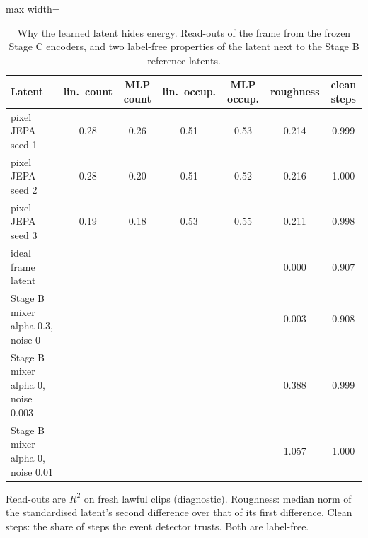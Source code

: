 \begin{table}[t]\centering\small
\caption{Why the learned latent hides energy. Read-outs of the frame from the frozen Stage C encoders, and two label-free properties of the latent next to the Stage B reference latents.}\label{tab:diag}
\begin{adjustbox}{max width=\linewidth}\begin{tabular}{lcccccc}\toprule
Latent & lin.\ count & MLP count & lin.\ occup. & MLP occup. & roughness & clean steps\\\midrule
pixel JEPA seed 1 & 0.28 & 0.26 & 0.51 & 0.53 & 0.214 & 0.999\\
pixel JEPA seed 2 & 0.28 & 0.20 & 0.51 & 0.52 & 0.216 & 1.000\\
pixel JEPA seed 3 & 0.19 & 0.18 & 0.53 & 0.55 & 0.211 & 0.998\\
\midrule
ideal frame latent & & & & & 0.000 & 0.907\\
Stage B mixer alpha 0.3, noise 0 & & & & & 0.003 & 0.908\\
Stage B mixer alpha 0, noise 0.003 & & & & & 0.388 & 0.999\\
Stage B mixer alpha 0, noise 0.01 & & & & & 1.057 & 1.000\\
\bottomrule\end{tabular}\end{adjustbox}
\par\smallskip\footnotesize Read-outs are $R^2$ on fresh lawful clips (diagnostic). Roughness: median norm of the standardised latent's second difference over that of its first difference. Clean steps: the share of steps the event detector trusts. Both are label-free.
\end{table}
